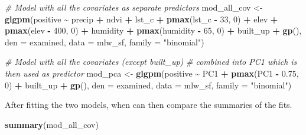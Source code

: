 \documentclass[
  letterpaper,
]{krantz}
\newenvironment{Shaded}{\begin{snugshade}}{\end{snugshade}}
\newcommand{\AttributeTok}[1]{\textcolor[rgb]{0.13,0.29,0.53}{#1}}
\newcommand{\CommentTok}[1]{\textcolor[rgb]{0.56,0.35,0.01}{\textit{#1}}}
\newcommand{\DecValTok}[1]{\textcolor[rgb]{0.00,0.00,0.81}{#1}}
\newcommand{\FloatTok}[1]{\textcolor[rgb]{0.00,0.00,0.81}{#1}}
\newcommand{\FunctionTok}[1]{\textcolor[rgb]{0.13,0.29,0.53}{\textbf{#1}}}
\newcommand{\NormalTok}[1]{#1}
\newcommand{\OtherTok}[1]{\textcolor[rgb]{0.56,0.35,0.01}{#1}}
\newcommand{\SpecialCharTok}[1]{\textcolor[rgb]{0.81,0.36,0.00}{\textbf{#1}}}
\newcommand{\StringTok}[1]{\textcolor[rgb]{0.31,0.60,0.02}{#1}}
\begin{document}
\begin{Shaded}
\begin{Highlighting}[]
\CommentTok{\# Model with all the covariates as separate predictors}
\NormalTok{mod\_all\_cov }\OtherTok{\textless{}{-}}
\FunctionTok{glgpm}\NormalTok{(positive }\SpecialCharTok{\textasciitilde{}}
\NormalTok{    precip }\SpecialCharTok{+}
\NormalTok{    ndvi }\SpecialCharTok{+}
\NormalTok{    lst\_c }\SpecialCharTok{+} \FunctionTok{pmax}\NormalTok{(lst\_c }\SpecialCharTok{{-}} \DecValTok{33}\NormalTok{, }\DecValTok{0}\NormalTok{) }\SpecialCharTok{+}
\NormalTok{    elev }\SpecialCharTok{+} \FunctionTok{pmax}\NormalTok{(elev }\SpecialCharTok{{-}} \DecValTok{400}\NormalTok{, }\DecValTok{0}\NormalTok{) }\SpecialCharTok{+}
\NormalTok{    humidity }\SpecialCharTok{+} \FunctionTok{pmax}\NormalTok{(humidity }\SpecialCharTok{{-}} \DecValTok{65}\NormalTok{, }\DecValTok{0}\NormalTok{) }\SpecialCharTok{+}
\NormalTok{    built\_up }\SpecialCharTok{+} \FunctionTok{gp}\NormalTok{(),}
    \AttributeTok{den =}\NormalTok{ examined,}
    \AttributeTok{data =}\NormalTok{ mlw\_sf,}
    \AttributeTok{family =} \StringTok{"binomial"}\NormalTok{)}

\CommentTok{\# Model with all the covariates (except \textasciigrave{}built\_up\textasciigrave{})}
\CommentTok{\# combined into PC1 which is then used as predictor}
\NormalTok{mod\_pca }\OtherTok{\textless{}{-}}
  \FunctionTok{glgpm}\NormalTok{(positive }\SpecialCharTok{\textasciitilde{}}
\NormalTok{          PC1 }\SpecialCharTok{+} \FunctionTok{pmax}\NormalTok{(PC1 }\SpecialCharTok{{-}} \FloatTok{0.75}\NormalTok{, }\DecValTok{0}\NormalTok{) }\SpecialCharTok{+}
\NormalTok{          built\_up }\SpecialCharTok{+} \FunctionTok{gp}\NormalTok{(),}
        \AttributeTok{den =}\NormalTok{ examined,}
        \AttributeTok{data =}\NormalTok{ mlw\_sf,}
        \AttributeTok{family =} \StringTok{"binomial"}\NormalTok{)}
\end{Highlighting}
\end{Shaded}

After fitting the two models, when can then compare the summaries of the
fits.

\begin{Shaded}
\begin{Highlighting}[]
\FunctionTok{summary}\NormalTok{(mod\_all\_cov)}
\end{Highlighting}
\end{Shaded}
\end{document}
